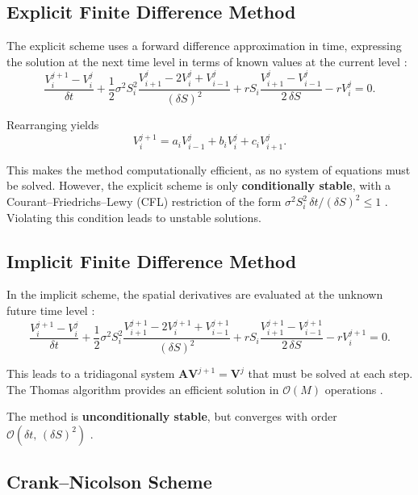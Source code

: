 \documentclass[12pt]{article}
\begin{document}
\subsection{Explicit Finite Difference Method}

The explicit scheme uses a forward difference approximation in time, expressing the
solution at the next time level in terms of known values at the current level
\cite{seydel2012}:
\begin{equation}
  \frac{V_i^{j+1} - V_i^j}{\delta t}
  + \frac{1}{2}\sigma^2 S_i^2 \frac{V_{i+1}^j - 2V_i^j + V_{i-1}^j}{(\delta S)^2}
  + rS_i\frac{V_{i+1}^j - V_{i-1}^j}{2\,\delta S} - rV_i^j = 0.
\end{equation}

Rearranging yields
\begin{equation}
  V_i^{j+1} = a_i V_{i-1}^j + b_i V_i^j + c_i V_{i+1}^j.
\end{equation}

This makes the method computationally efficient, as no system of equations must be
solved. However, the explicit scheme is only \textbf{conditionally stable}, with a
Courant--Friedrichs--Lewy (CFL) restriction of the form
$\sigma^2 S_i^2\,\delta t / (\delta S)^2 \leq 1$ \cite{wilmott2006}. Violating this
condition leads to unstable solutions.

\subsection{Implicit Finite Difference Method}

In the implicit scheme, the spatial derivatives are evaluated at the unknown future
time level \cite{seydel2012}:
\begin{equation}
  \frac{V_i^{j+1} - V_i^j}{\delta t}
  + \frac{1}{2}\sigma^2 S_i^2 \frac{V_{i+1}^{j+1} - 2V_i^{j+1} + V_{i-1}^{j+1}}{(\delta S)^2}
  + rS_i\frac{V_{i+1}^{j+1} - V_{i-1}^{j+1}}{2\,\delta S} - rV_i^{j+1} = 0.
\end{equation}

This leads to a tridiagonal system $\mathbf{A}\mathbf{V}^{j+1} = \mathbf{V}^j$ that
must be solved at each step. The Thomas algorithm provides an efficient solution in
$\mathcal{O}(M)$ operations \cite{thomas1949}.

The method is \textbf{unconditionally stable}, but converges with order
$\mathcal{O}(\delta t,\,(\delta S)^2)$ \cite{seydel2012}.

\subsection{Crank--Nicolson Scheme}
\end{document}
